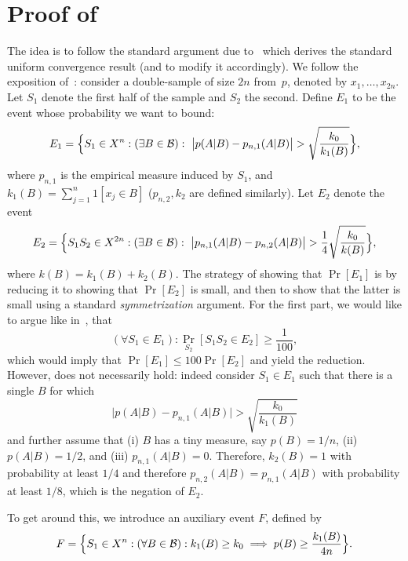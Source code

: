 \documentclass{article}
\newcommand{\B}{{\cal B}}
\begin{document}
\section{Proof of }

The idea is to follow the standard argument due to~\cite{vapnik} 
which derives the standard uniform convergence result (and to modify it accordingly). 
We follow the exposition of~\cite{anthony}:
consider a double-sample of size $2n$ from~$p$, denoted by $x_1,\ldots,x_{2n}$.
Let $S_1$ denote the first half of the sample and $S_2$ the second.
Define $E_1$ to be the event whose probability we want to bound:
\[E_1 = \Bigl\{ S_1\in X^n : (\exists B\in \B):~ 
\bigl\lvert p(A \vert B) - p_{n,1}(A \vert B) \bigr\rvert > 
\sqrt{\frac{k_0}{k_{1}(B)}} \Bigr\},\]
where $p_{n,1}$ is the empirical measure induced by $S_1$, 
and $k_{1}(B)=\sum_{j=1}^n 1[x_j\in B]$ ($p_{n,2}, k_{2}$ are defined similarly).
Let $E_2$ denote the event
\[E_2 = 
\Bigl\{
S_1S_2\in X^{2n} : (\exists B\in\B):~
\bigl\lvert p_{n,1}(A \vert B)   -  p_{n,2}(A \vert B) \bigr\rvert >  
\frac{1}{4}\sqrt{\frac{k_0}{k(B)}}
\Bigr\},
\]
where $k(B) = k_{1}(B)+k_{2}(B)$.
The strategy of showing that $\Pr[E_1]$ is by reducing it to showing that $\Pr[E_2]$ 
is small, and then to show that the latter is small using a standard \emph{symmetrization} argument. 
For the first part, we would like to argue like in~\cite{anthony}, that
\begin{equation}\label{eq:anthony} 
(\forall S_1\in E_1): \Pr_{S_2}[S_1S_2\in E_2]\geq \frac{1}{100},
\end{equation}
which would imply that $\Pr[E_1]\leq 100\Pr[E_2]$ and yield the reduction.
However,  does not necessarily hold: indeed consider
$S_1\in E_1$ such that there is a single $B$ for which 
\[
\bigl\lvert p(A \vert B) - p_{n,1}(A \vert B) \bigr\rvert > 
\sqrt{\frac{k_0}{k_{1}(B)}}
\]
and further assume that 
(i) $B$ has a tiny measure, say $p(B) = 1/n$,
(ii) $p(A\vert B)= 1/2$, and
(iii) $p_{n,1}(A\vert B) = 0$.
Therefore, $k_2(B)=1$ with probability at least $1/4$
and therefore $p_{n,2}(A \vert B)=p_{n,1}(A \vert B)$
with probability at least $1/8$, which is the negation of $E_2$.

To get around this, we introduce an auxiliary event $F$, defined by
\[F = \Bigl\{S_1\in X^{n} : (\forall B\in\B): k_{1}(B) \geq k_0 \implies p(B)\geq \frac{k_{1}(B)}{4n}\Bigr\}. \]
\end{document}
